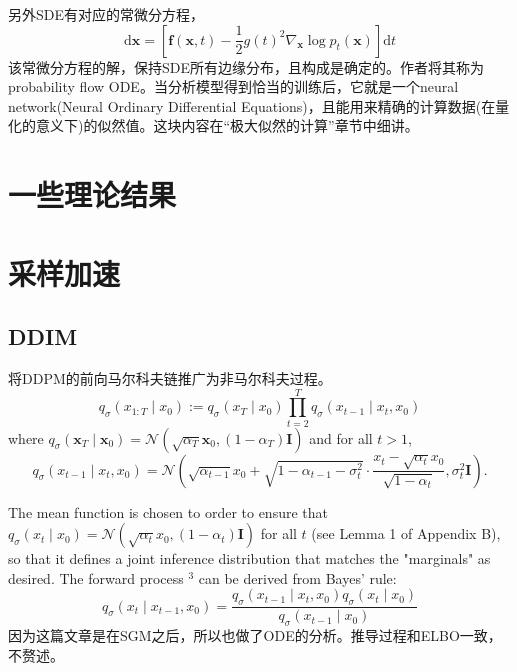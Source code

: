 \documentclass[lang=cn,newtx,10pt,scheme=chinese]{elegantbook}
\begin{document}
另外SDE有对应的常微分方程，
\begin{equation}
\mathrm{d} \mathbf{x}=\left[\mathbf{f}(\mathbf{x}, t)-\frac{1}{2} g(t)^2 \nabla_{\mathbf{x}} \log p_t(\mathbf{x})\right] \mathrm{d} t
\end{equation}
该常微分方程的解，保持SDE所有边缘分布，且构成是确定的。作者将其称为probability flow ODE。当分析模型得到恰当的训练后，它就是一个neural network(Neural Ordinary Differential Equations)，且能用来精确的计算数据(在量化的意义下)的似然值。这块内容在“极大似然的计算”章节中细讲。

\section{一些理论结果}

\section{采样加速}
\subsection{DDIM}
将DDPM的前向马尔科夫链推广为非马尔科夫过程。
$$
q_\sigma\left(x_{1: T} \mid x_0\right):=q_\sigma\left(x_T \mid x_0\right) \prod_{t=2}^T q_\sigma\left(x_{t-1} \mid x_t, x_0\right)
$$
where $q_\sigma\left(\boldsymbol{x}_T \mid \boldsymbol{x}_0\right)=\mathcal{N}\left(\sqrt{\alpha_T} \boldsymbol{x}_0,\left(1-\alpha_T\right) \boldsymbol{I}\right)$ and for all $t>1$,
$$
q_\sigma\left(x_{t-1} \mid x_t, x_0\right)=\mathcal{N}\left(\sqrt{\alpha_{t-1}} x_0+\sqrt{1-\alpha_{t-1}-\sigma_t^2} \cdot \frac{x_t-\sqrt{\alpha_t} x_0}{\sqrt{1-\alpha_t}}, \sigma_t^2 \boldsymbol{I}\right) .
$$

The mean function is chosen to order to ensure that $q_\sigma\left(x_t \mid x_0\right)=\mathcal{N}\left(\sqrt{\alpha_t} x_0,\left(1-\alpha_t\right) \boldsymbol{I}\right)$ for all $t$ (see Lemma 1 of Appendix B), so that it defines a joint 
inference distribution that matches the "marginals" as desired. The forward process ${ }^3$ can be derived from Bayes' rule:
$$
q_\sigma\left(x_t \mid x_{t-1}, x_0\right)=\frac{q_\sigma\left(x_{t-1} \mid x_t, x_0\right) q_\sigma\left(x_t \mid x_0\right)}{q_\sigma\left(x_{t-1} \mid x_0\right)}
$$
因为这篇文章是在SGM之后，所以也做了ODE的分析。推导过程和ELBO一致，不赘述。
\end{document}
